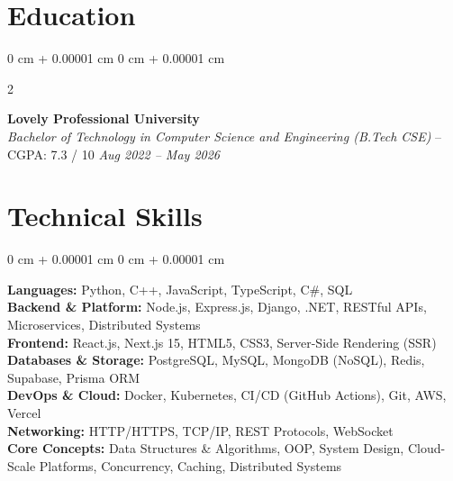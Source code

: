 \documentclass[9pt, letterpaper]{article}
\newenvironment{onecolentry}{
    \begin{adjustwidth}{
        0 cm + 0.00001 cm
    }{
        0 cm + 0.00001 cm
    }
}{
    \end{adjustwidth}
} %
\newenvironment{twocolentry}[2][]{%
    \onecolentry
    \def\secondColumn{#2}
    \setcolumnwidth{\fill, 4.5 cm}
    \begin{paracol}{2}
}{%
    \switchcolumn \raggedleft \secondColumn
    \end{paracol}
    \end{onecolentry}
}
\begin{document}
\section{Education}
\begin{twocolentry}{\textit{Aug 2022 -- May 2026}}
    \textbf{Lovely Professional University}\\
    \textit{Bachelor of Technology in Computer Science and Engineering (B.Tech CSE)} -- CGPA: 7.3 / 10
\end{twocolentry}

        
\section{Technical Skills}

\begin{onecolentry}
    \textbf{Languages:} Python, C++, JavaScript, TypeScript, C\#, SQL \\[2pt]
    \textbf{Backend \& Platform:} Node.js, Express.js, Django, .NET, RESTful APIs, Microservices, Distributed Systems \\[2pt]
    \textbf{Frontend:} React.js, Next.js 15, HTML5, CSS3, Server-Side Rendering (SSR) \\[2pt]
    \textbf{Databases \& Storage:} PostgreSQL, MySQL, MongoDB (NoSQL), Redis, Supabase, Prisma ORM \\[2pt]
    \textbf{DevOps \& Cloud:} Docker, Kubernetes, CI/CD (GitHub Actions), Git, AWS, Vercel \\[2pt]
    \textbf{Networking:} HTTP/HTTPS, TCP/IP, REST Protocols, WebSocket \\[2pt]
    \textbf{Core Concepts:} Data Structures \& Algorithms, OOP, System Design, Cloud-Scale Platforms, Concurrency, Caching, Distributed Systems \\[2pt]
\end{onecolentry}
\end{document}

